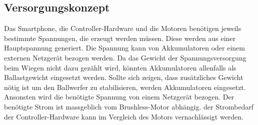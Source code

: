 \subsection{Versorgungskonzept}
	Das Smartphone, die Controller-Hardware und die Motoren benötigen jeweils bestimmte Spannungen, die erzeugt werden müssen. Diese werden aus einer Hauptspannung generiert. Die Spannung kann von Akkumulatoren oder einem externen Netzgerät bezogen werden. Da das Gewicht der Spannungsversorgung beim Wiegen nicht dazu gezählt wird, könnten Akkumulatoren allenfalls als Ballastgewicht eingesetzt werden. Sollte sich zeigen, dass zusätzliches Gewicht nötig ist um den Ballwerfer zu stabilisieren, werden Akkumulatoren eingesetzt. Ansonsten wird die benötigte Spannung von einem Netzgerät bezogen. Der benötigte Strom ist massgeblich vom Brushless-Motor abhängig. der  Strombedarf der Controller-Hardware kann im Vergleich des Motors vernachlässigt werden.